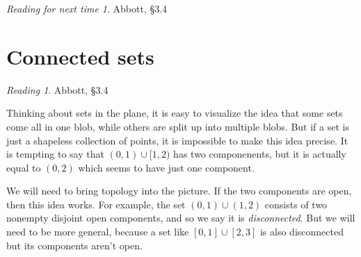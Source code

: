 \documentclass[11pt,oneside]{amsbook}
\newcommand{\R}{\mathbb R}
\theoremstyle{definition}
\newtheorem{exerc}{Exercise}[section]
\theoremstyle{plain}
\theoremstyle{definition}
\theoremstyle{remark}
\newtheorem*{reading}{Reading}
\newtheorem*{readnext}{Reading for next time}
\numberwithin{equation}{section}
\numberwithin{figure}{section}
\begin{document}
%
%

\begin{readnext}
  Abbott, \S 3.4
\end{readnext}


\newpage
\section{Connected sets}

\begin{reading}
  Abbott, \S 3.4
\end{reading}

Thinking about sets in the plane, it is easy to visualize the idea that some sets come all in one blob, while others are split up into multiple blobs. But if a set is just a shapeless collection of points, it is impossible to make this idea precise. It is tempting to say that $(0,1)\cup[1,2)$ has two componenents, but it is actually equal to $(0,2)$ which seems to have just one component.

We will need to bring topology into the picture. If the two components are open, then this idea works. For example, the set $(0,1)\cup(1,2)$ consists of two nonempty disjoint open components, and so we say it is \emph{disconnected}. But we will need to be more general, because a set like $[0,1]\cup[2,3]$ is also disconnected but its components aren't open.
\end{document}
